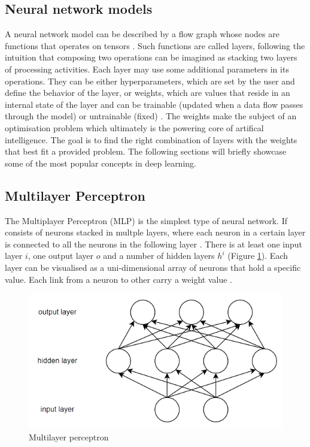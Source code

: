 \subsection{Neural network models}
\label{subsec:ch3sec3subsec1}

A neural network model can be described by a flow graph whose nodes are functions that operates on tensors \cite{Tensorflow}. Such functions are called layers, following the intuition that composing two operations can be imagined as stacking two layers of processing activities. Each layer may use some additional parameters in its operations. They can be either hyperparameters, which are set by the user and define the behavior of the layer, or weights, which are values that reside in an internal state of the layer and can be trainable (updated when a data flow passes through the model) or untrainable (fixed) \cite{Tensorflow}. The weights make the subject of an optimisation problem which ultimately is the powering core of artifical intelligence. The goal is to find the right combination of layers with the weights that best fit a provided problem. The following sections will briefly showcase some of the most popular concepts in deep learning.

\subsection{Multilayer Perceptron}
\label{subsec:ch3sec3subsec2}

The Multiplayer Perceptron (MLP) is the simplest type of neural network. If consists of neurons stacked in multple layers, where each neuron in a certain layer is connected to all the neurons in the following layer \cite{D2l}. There is at least one input layer $i$, one output layer $o$ and a number of hidden layers $h^{i}$ (Figure \ref{FigMLP}). Each layer can be visualised as a uni-dimensional array of neurons that hold a specific value. Each link from a neuron to other carry a weight value \cite{D2l}. 

\begin{figure}[htbp]
    \centering
        \includegraphics[scale=0.6]{figures/mlp.png}
    \caption{Multilayer perceptron}
    \label{FigMLP}        
\end{figure}

